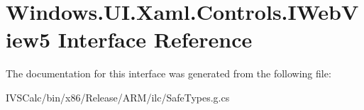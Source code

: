 \hypertarget{interface_windows_1_1_u_i_1_1_xaml_1_1_controls_1_1_i_web_view5}{}\section{Windows.\+U\+I.\+Xaml.\+Controls.\+I\+Web\+View5 Interface Reference}
\label{interface_windows_1_1_u_i_1_1_xaml_1_1_controls_1_1_i_web_view5}


The documentation for this interface was generated from the following file\+:\begin{DoxyCompactItemize}
\item 
I\+V\+S\+Calc/bin/x86/\+Release/\+A\+R\+M/ilc/Safe\+Types.\+g.\+cs\end{DoxyCompactItemize}

